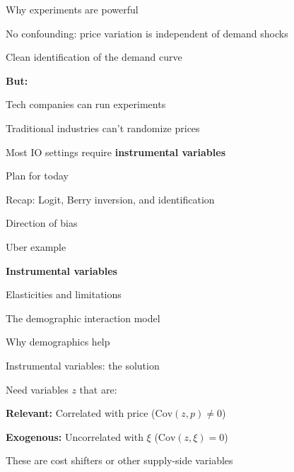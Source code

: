 \documentclass[notes,11pt, aspectratio=169]{beamer}
\newenvironment{wideitemize}{\itemize\addtolength{\itemsep}{10pt}}{\enditemize}
\newenvironment{wideenumerate}{\enumerate\addtolength{\itemsep}{10pt}}{\endenumerate}
\begin{document}
\begin{frame}{Why experiments are powerful}
	\begin{wideitemize}
		\item No confounding: price variation is independent of demand shocks
		\item Clean identification of the demand curve
		\item \textbf{But:}
		\begin{wideitemize}
			\vspace{5pt}
			\item Tech companies can run experiments
			\item Traditional industries can't randomize prices
			\item Most IO settings require \textbf{instrumental variables}
		\end{wideitemize}
	\end{wideitemize}
\end{frame}

\begin{frame}{Plan for today}
  \begin{wideenumerate}
    \item Recap: Logit, Berry inversion, and identification
    \item Direction of bias
    \item Uber example
    \item \textbf{Instrumental variables}
    \item Elasticities and limitations
    \item The demographic interaction model
    \item Why demographics help
  \end{wideenumerate}
\end{frame}

\begin{frame}{Instrumental variables: the solution}
	\begin{wideitemize}
		\item Need variables $z$ that are: \pause
		\begin{wideenumerate}
			\vspace{5pt}
			\item \textbf{Relevant:} Correlated with price ($\text{Cov}(z, p) \neq 0$)
			\item \textbf{Exogenous:} Uncorrelated with $\xi$ ($\text{Cov}(z, \xi) = 0$)
		\end{wideenumerate}
		\item These are cost shifters or other supply-side variables
	\end{wideitemize}
\end{frame}
\end{document}
